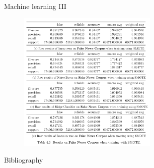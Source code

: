 \documentclass{beamer}
\begin{document}
	\begin{frame}{Machine learning III}
	\begin{figure}
		\centering
			\includegraphics[width=0.6\textwidth]{res3.png}
		\end{figure}
	\end{frame}
  \begin{frame}[allowframebreaks]{Bibliography}
    
	
	\note{}
  \end{frame}
\end{document}
